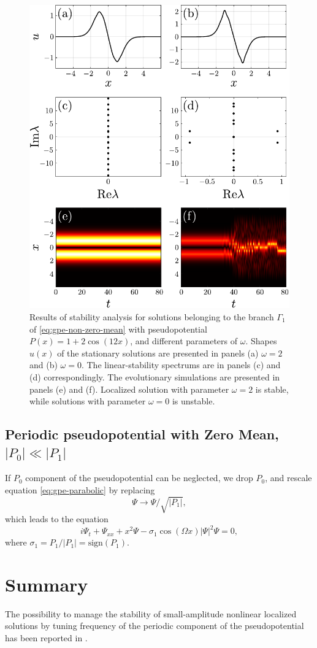 \begin{figure}[h]
\centering
	\includegraphics[scale = 1]{pic/stability, non-zero cosine nho}
	\caption{
		Results of stability analysis for solutions belonging to the branch $\Gamma_1$ of \eqref{eq:gpe-non-zero-mean} with pseudopotential $P(x) = 1 + 2 \cos (12 x)$, and different parameters of $\omega$.
		Shapes $u(x)$ of the stationary solutions are presented in panels (a) $\omega = 2$ and (b) $\omega = 0$.
		The linear-stability spectrums are in panels (c) and (d) correspondingly.
		The evolutionary simulations are presented in panels (e) and (f).
		Localized solution with parameter $\omega = 2$ is stable, while solutions with parameter $\omega = 0$ is unstable.
	}
\label{fig:stability-nho-non-zero-mean}
\end{figure}

\subsection{Periodic pseudopotential with Zero Mean, $|P_0| \ll |P_1|$}

If $P_0$ component of the pseudopotential can be neglected, we drop $P_0$, and rescale equation \eqref{eq:gpe-parabolic} by replacing
\begin{equation}
	\Psi \to \Psi / \sqrt{|P_1|},
\end{equation}
which leads to the equation
\begin{equation}
	i \Psi_t + \Psi_{xx} + x^2 \Psi - \sigma_1 \cos (\Omega x) |\Psi|^2 \Psi = 0,
\label{eq:nho-zero-mean}
\end{equation}
where $\sigma_1 = P_1 / |P_1| = \mathrm{sign}(P_1)$.


\section{Summary}

The possibility to manage the stability of small-amplitude nonlinear localized solutions by tuning frequency of the periodic component of the pseudopotential has been reported in \cite{KevrekidisFrantzeskakis}.
